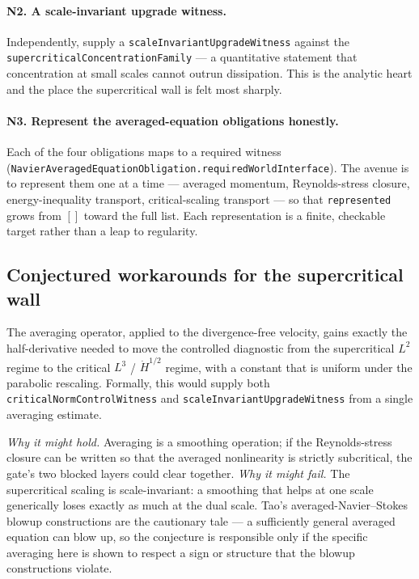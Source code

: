 \paragraph{N2. A scale-invariant upgrade witness.} Independently, supply a
\verb|scaleInvariantUpgradeWitness| against the
\verb|supercriticalConcentrationFamily| --- a quantitative statement that
concentration at small scales cannot outrun dissipation. This is the analytic
heart and the place the supercritical wall is felt most sharply.

\paragraph{N3. Represent the averaged-equation obligations honestly.} Each of the
four obligations maps to a required witness
(\verb|NavierAveragedEquationObligation.requiredWorldInterface|). The avenue is
to represent them one at a time --- averaged momentum, Reynolds-stress closure,
energy-inequality transport, critical-scaling transport --- so that
\verb|represented| grows from $[]$ toward the full list. Each representation is a
finite, checkable target rather than a leap to regularity.

\subsection{Conjectured workarounds for the supercritical wall}

\begin{conjecture}
\label{conj:ns-averaging-gain}
The averaging operator, applied to the divergence-free velocity, gains exactly
the half-derivative needed to move the controlled diagnostic from the
supercritical $L^2$ regime to the critical $L^3$ / $\dot H^{1/2}$ regime, with a
constant that is uniform under the parabolic rescaling. Formally, this would
supply both \verb|criticalNormControlWitness| and
\verb|scaleInvariantUpgradeWitness| from a single averaging estimate.
\end{conjecture}

\noindent\emph{Why it might hold.} Averaging is a smoothing operation; if the
Reynolds-stress closure can be written so that the averaged nonlinearity is
strictly subcritical, the gate's two blocked layers could clear together.
\emph{Why it might fail.} The supercritical scaling is scale-invariant: a
smoothing that helps at one scale generically loses exactly as much at the dual
scale. Tao's averaged-Navier--Stokes blowup constructions are the cautionary
tale --- a sufficiently general averaged equation can blow up, so the conjecture
is responsible only if the specific averaging here is shown to respect a sign or
structure that the blowup constructions violate.

